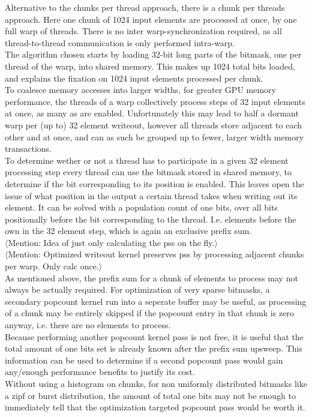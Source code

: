 \documentclass{tudscrreprt}
\newcommand{\markr}[1]{\textcolor{review}{$\langle$#1$\rangle$}}
\begin{document}
			Alternative to the chunks per thread approach, there is a chunk per threads approach. Here one chunk of 1024 input elements are processed at once, by one full warp of threads. There is no inter warp-synchronization required, as all thread-to-thread communication is only performed intra-warp. \\
			The algorithm chosen starts by loading 32-bit long parts of the bitmask, one per thread of the warp, into shared memory. This makes up 1024 total bits loaded, and explains the fixation on 1024 input elements processed per chunk. \\
			To coalesce memory accesses into larger widths, for greater GPU memory performance, the threads of a warp collectively process steps of 32 input elements at once, as many as are enabled. Unfortunately this may lead to half a dormant warp per (up to) 32 element writeout, however all threads store adjacent to each other and at once, and can as such be grouped up to fewer, larger width memory transactions. \\
			To determine wether or not a thread has to participate in a given 32 element processing step every thread can use the bitmask stored in shared memory, to determine if the bit corresponding to its position is enabled. This leaves open the issue of what position in the output a certain thread takes when writing out its element. It can be solved with a population count of one bits, over all bits positionally before the bit corresponding to the thread. I.e. elements before the own in the 32 element step, which is again an exclusive prefix sum. \\
			
			\markr{Mention: Idea of just only calculating the pss on the fly.}\\
			\markr{Mention: Optimized writeout kernel preserves pss by processing adjacent chunks per warp. Only calc once.}\\
			As mentioned above, the prefix sum for a chunk of elements to process may not always be actually required. For optimization of very sparse bitmasks, a secondary popcount kernel run into a seperate buffer may be useful, as processing of a chunk may be entirely skipped if the popcount entry in that chunk is zero anyway, i.e. there are no elements to process. \\
			Because performing another popcount kernel pass is not free, it is useful that the total amount of one bits set is already known after the prefix sum upsweep. This information can be used to determine if a second popcount pass would gain any/enough performance benefits to justify its cost. \\
			Without using a histogram on chunks, for non uniformly distributed bitmasks like a zipf or burst distribution, the amount of total one bits may not be enough to immediately tell that the optimization targeted popcount pass would be worth it. \\
			
\end{document}
